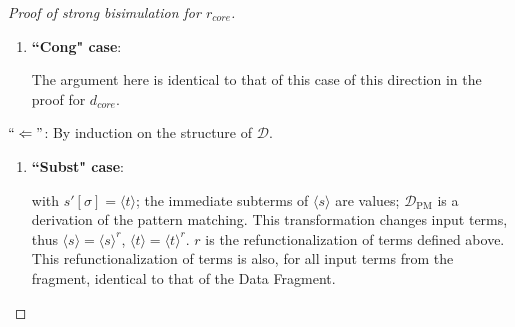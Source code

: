 \begin{proof}[Proof of strong bisimulation for $r_{core}$]
\begin{enumerate}
\begin{itemize}
\item \underline{Case 3}: $q$ is hole pattern and has a first argument which is a constructor pattern:

Then the function definition that contains $`` q = s' "$ contains only equations where the left-hand side is a hole pattern (other cases are excluded by the relevant input fragment for $r_{core}$), and it has a first argument with data type. Thus $s$ reduces to $t$ already with respect to the part of the program that is passed to $des\_conv$, and then the result of this to $r^{data}$, as specified in the definition of $r_{core}$. Let the part passed to $des\_conv$ be $prg'$; it is: $s \longrightarrow_{prg'} t$.

By (*) we have

\begin{equation*}
s \longrightarrow_{prg'} t \iff \langle s \rangle \longrightarrow_{\langle prg' \rangle^{r^{data}}} \langle t \rangle,
\end{equation*}

But this program $\langle prg' \rangle^{r^{data}}$ is a subset of $\langle prg \rangle$, as can be seen in the definition of $r_{core}$. Thus we have the desired $\langle s \rangle \longrightarrow_{\langle prg \rangle} \langle t \rangle$.

\end{itemize}

\item \textbf{``Cong" case}:

The argument here is identical to that of this case of this direction in the proof for $d_{core}$.

\end{enumerate}

$`` \Leftarrow "$: By induction on the structure of $\mathcal{D}$.

\begin{enumerate}
\item \textbf{``Subst" case}:

\begin{prooftree}
\end{prooftree}

with $s'[\sigma] = \langle t \rangle$; the immediate subterms of $\langle s \rangle$ are values; $\mathcal{D}_{\textrm{PM}}$ is a derivation of the pattern matching. This transformation changes input terms, thus $\langle s \rangle = \langle s \rangle^r$, $\langle t \rangle = \langle t \rangle^r$. $r$ is the refunctionalization of terms defined above. This refunctionalization of terms is also, for all input terms from the fragment, identical to that of the Data Fragment.


\end{enumerate}
\end{proof}
